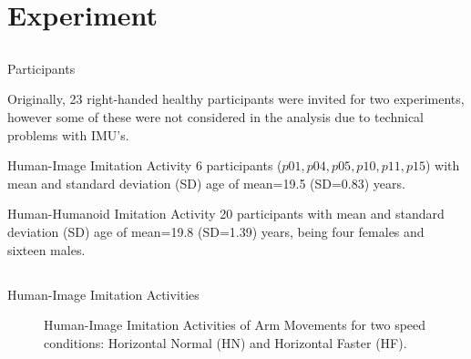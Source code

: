 \section{Experiment}

\subsection{}
{

\begin{frame}{Participants}

Originally, 23 right-handed healthy participants were invited for 
two experiments, however some of these were not considered in the 
analysis due to technical problems with IMU's.

\begin{block}{Human-Image Imitation Activity}
6 participants ($p01, p04, p05, p10, p11, p15$) 
with mean and standard deviation (SD) age of mean=19.5 (SD=0.83) years. 
\end{block}

\begin{block}{Human-Humanoid Imitation Activity}
20 participants with mean and standard deviation (SD) age of 
mean=19.8 (SD=1.39) years, being four females and sixteen males.
\end{block}


\end{frame}
}


\subsection{}
{

\begin{frame}{Human-Image Imitation Activities}
    \begin{figure}
	\caption[PA]{
		Human-Image Imitation Activities of 	
		Arm Movements for two speed conditions:
		Horizontal Normal (HN) and Horizontal Faster (HF).
		}
   \end{figure}
	
\end{frame}
}



